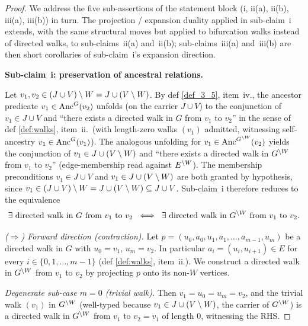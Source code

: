 \documentclass[main]{subfiles}
\begin{document}
\begin{proof}
We address the five sub-assertions of the statement block (i, ii(a), ii(b), iii(a), iii(b)) in turn. The projection / expansion duality applied in sub-claim~i extends, with the same structural moves but applied to bifurcation walks instead of directed walks, to sub-claims~ii(a) and~ii(b); sub-claims~iii(a) and~iii(b) are then short corollaries of sub-claim~i's expansion direction.

\medskip\noindent\textbf{Sub-claim~i: preservation of ancestral relations.}

Let $v_1, v_2 \in (J \cup V) \setminus W = J \cup (V \setminus W)$. By def \ref{def_3_5}, item~iv., the ancestor predicate $v_1 \in \mathrm{Anc}^G(v_2)$ unfolds (on the carrier $J \cup V$) to the conjunction of $v_1 \in J \cup V$ and ``there exists a directed walk in $G$ from $v_1$ to $v_2$'' in the sense of def \ref{def:walks}, item~ii.\ (with length-zero walks $(v_1)$ admitted, witnessing self-ancestry $v_1 \in \mathrm{Anc}^G(v_1)$). The analogous unfolding for $v_1 \in \mathrm{Anc}^{G^{\setminus W}}(v_2)$ yields the conjunction of $v_1 \in J \cup (V \setminus W)$ and ``there exists a directed walk in $G^{\setminus W}$ from $v_1$ to $v_2$'' (edge-membership read against $E^{\setminus W}$). The membership preconditions $v_1 \in J \cup V$ and $v_1 \in J \cup (V \setminus W)$ are both granted by hypothesis, since $v_1 \in (J \cup V) \setminus W = J \cup (V \setminus W) \subseteq J \cup V$. Sub-claim~i therefore reduces to the equivalence
\[
    \exists \text{ directed walk in } G \text{ from } v_1 \text{ to } v_2
    \;\iff\;
    \exists \text{ directed walk in } G^{\setminus W} \text{ from } v_1 \text{ to } v_2.
\]

\smallskip\noindent\emph{($\Rightarrow$) Forward direction (contraction).}
Let $p = (u_0, a_0, u_1, a_1, \dots, a_{m-1}, u_m)$ be a directed walk in $G$ with $u_0 = v_1$, $u_m = v_2$. In particular $a_i = (u_i, u_{i+1}) \in E$ for every $i \in \{0, 1, \dots, m-1\}$ (def \ref{def:walks}, item~ii.). We construct a directed walk in $G^{\setminus W}$ from $v_1$ to $v_2$ by projecting $p$ onto its non-$W$ vertices.

\emph{Degenerate sub-case $m = 0$ (trivial walk).} Then $v_1 = u_0 = u_m = v_2$, and the trivial walk $(v_1)$ in $G^{\setminus W}$ (well-typed because $v_1 \in J \cup (V \setminus W)$, the carrier of $G^{\setminus W}$) is a directed walk in $G^{\setminus W}$ from $v_1$ to $v_2 = v_1$ of length $0$, witnessing the RHS.


\end{proof}
\end{document}
